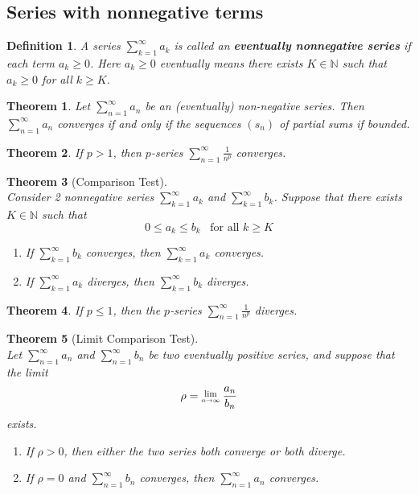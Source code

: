 \documentclass[8pt]{article}
\newcommand{\Lim}[1]{\raisebox{0.5ex}{\scalebox{0.8}{$\displaystyle \lim_{#1}\;$}}}
\newtheorem{definition}{Definition}[section]
\newtheorem{theorem}{Theorem}[section]
\theoremstyle{definition}
\begin{document}
\subsection{Series with nonnegative terms}
\begin{definition}\normalfont A series $\sum_{k=1}^\infty a_k$ is called an \textbf{eventually nonnegative series} if each term $a_k\geq 0$. Here $a_k\geq 0$ eventually means there exists $K\in\mathbb{N}$ such that $a_k\geq 0$ for all $k\geq K$.
\end{definition}
\begin{theorem}\normalfont Let $\sum_{n=1}^\infty a_n$ be an (eventually) non-negative series. Then $\sum_{n=1}^\infty a_n$ converges if and only if the sequences $(s_n)$ of partial sums if bounded.
\end{theorem}
\begin{theorem}\normalfont If $p>1$, then $p$-series $\sum_{n=1}^\infty \frac{1}{n^p}$ converges.
\end{theorem}
\begin{theorem}[Comparison Test]
\hfill\\\normalfont Consider 2 nonnegative series $\sum_{k=1}^\infty a_k$ and $\sum_{k=1}^\infty b_k$. Suppose that there exists $K\in\mathbb{N}$ such that
\[
0\leq a_k\leq b_k\;\;\;\text{for all }k\geq K
\] 
\begin{enumerate}
\item If $\sum_{k=1}^\infty b_k$ converges, then $\sum_{k=1}^\infty a_k$ converges.
\item If $\sum_{k=1}^\infty a_k$ diverges, then $\sum_{k=1}^\infty b_k$ diverges.
\end{enumerate}
\end{theorem}
\begin{theorem}\normalfont If $p\leq 1$, then the $p$-series $\sum_{n=1}^\infty \frac{1}{n^p}$ diverges.
\end{theorem}
\begin{theorem}[Limit Comparison Test]
\hfill\\\normalfont Let $\sum_{n=1}^\infty a_n$ and $\sum_{n=1}^\infty b_n$ be two eventually positive series, and suppose that the limit
\[
\rho = \Lim{n\to\infty}\frac{a_n}{b_n}
\]
exists.
\begin{enumerate}
\item If $\rho>0$, then either the two series both converge or both diverge.
\item If $\rho=0$ and $\sum_{n=1}^\infty b_n$ converges, then $\sum_{n=1}^\infty a_n$ converges.
\end{enumerate}
\end{theorem}
\end{document}
